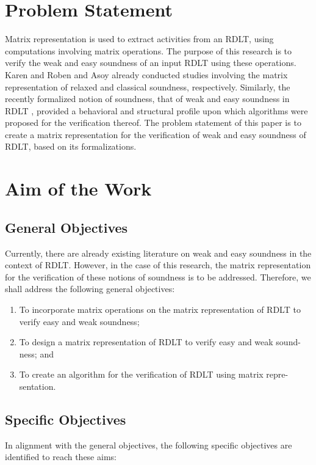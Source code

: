 

\section{Problem Statement}
Matrix representation is used to extract activities from an RDLT, using computations involving matrix operations. The purpose of this research is to verify the weak and easy soundness of an input RDLT using these operations. Karen and Roben \cite{KarenRoben2018} and Asoy \cite{Asoy2024} already conducted studies involving the matrix representation of relaxed and classical soundness, respectively. Similarly, the recently formalized notion of soundness, that of weak and easy soundness in RDLT \cite{Ramirez2024}, provided a behavioral and structural profile upon which algorithms were proposed for the verification thereof. The problem statement of this paper is to create a matrix representation for the verification of weak and easy soundness of RDLT, based on its formalizations.
\section{Aim of the Work}
\subsection*{General Objectives}
Currently, there are already existing literature on weak and easy soundness in the context of RDLT. However, in the case of this research, the matrix representation for the verification of these notions of soundness is to be addressed. Therefore, we shall address the following general objectives:
\begin{enumerate}
    \item To incorporate matrix operations on the matrix representation of RDLT to verify easy and weak soundness;
    \item To design a matrix representation of RDLT to verify easy and weak sound- ness; and
    \item To create an algorithm for the verification of RDLT using matrix repre- sentation.
\end{enumerate}
\subsection*{Specific Objectives}
In alignment with the general objectives, the following specific objectives are identified to reach these aims:
